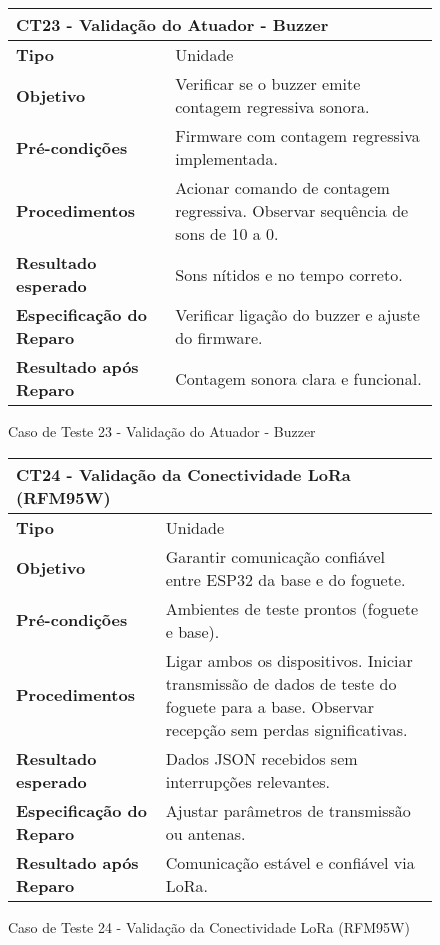 \begin{figure}[H]
    \centering
\begin{longtable}{|p{}|p{}|}
\hline
\multicolumn{2}{|l|}{\textbf{CT23 - Validação do Atuador - Buzzer}} \\
\hline
\textbf{Tipo} & Unidade \\
\hline
\textbf{Objetivo} & Verificar se o buzzer emite contagem regressiva sonora. \\
\hline
\textbf{Pré-condições} & Firmware com contagem regressiva implementada. \\
\hline
\textbf{Procedimentos} &  Acionar comando de contagem regressiva.  Observar sequência de sons de 10 a 0.  \\
\hline
\textbf{Resultado esperado} & Sons nítidos e no tempo correto. \\
\hline
\textbf{Especificação do Reparo} & Verificar ligação do buzzer e ajuste do firmware. \\
\hline
\textbf{Resultado após Reparo} & Contagem sonora clara e funcional. \\
\hline
\end{longtable}
\caption{Caso de Teste 23 - Validação do Atuador - Buzzer}
\label{fig_ct20_validacao_atuador_buzzer}
\end{figure}

\begin{figure}[H]
    \centering
\begin{longtable}{|p{}|p{}|}
\hline
\multicolumn{2}{|l|}{\textbf{CT24 - Validação da Conectividade LoRa (RFM95W)}} \\
\hline
\textbf{Tipo} & Unidade \\
\hline
\textbf{Objetivo} & Garantir comunicação confiável entre ESP32 da base e do foguete. \\
\hline
\textbf{Pré-condições} & Ambientes de teste prontos (foguete e base). \\
\hline
\textbf{Procedimentos} &  Ligar ambos os dispositivos.  Iniciar transmissão de dados de teste do foguete para a base.  Observar recepção sem perdas significativas.  \\
\hline
\textbf{Resultado esperado} & Dados JSON recebidos sem interrupções relevantes. \\
\hline
\textbf{Especificação do Reparo} & Ajustar parâmetros de transmissão ou antenas. \\
\hline
\textbf{Resultado após Reparo} & Comunicação estável e confiável via LoRa. \\
\hline
\end{longtable}
\caption{Caso de Teste 24 - Validação da Conectividade LoRa (RFM95W)}
\label{fig_ct21_validacao_conectividade_lora}
\end{figure}

